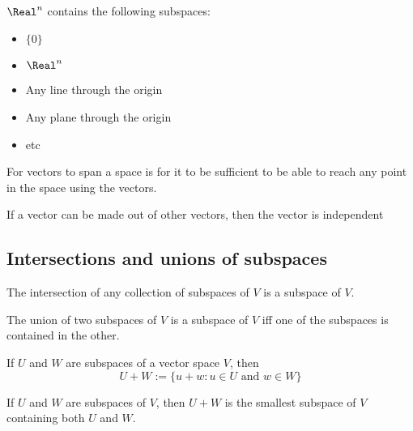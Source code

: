 \begin{theorem}
  $\Real^n$ contains the following subspaces:
  \begin{itemize}
    \item $\{ 0 \}$
    \item $\Real^n$
    \item Any line through the origin
    \item Any plane through the origin
    \item etc
  \end{itemize}
\end{theorem}

\begin{definition}[Spanning]
  For vectors to span a space is for it to be sufficient to be able to reach any point in the space using the vectors.
\end{definition}

\begin{definition}[Independence]
  If a vector can be made out of other vectors, then the vector is independent
\end{definition}

\subsection{Intersections and unions of subspaces}

\begin{theorem}
  The intersection of any collection of subspaces of $V$ is a subspace of $V$.
\end{theorem}

\begin{theorem}
  The union of two subspaces of $V$ is a subspace of $V$ iff one of the subspaces is contained in the other.
\end{theorem}

\begin{definition}
  If $U$ and $W$ are subspaces of a vector space $V$, then
  \[
    U + W := \{ u + w : u \in U \text{ and } w \in W \}
  \]
\end{definition}

\begin{theorem}
  If $U$ and $W$ are subspaces of $V$, then $U + W$ is the smallest subspace of $V$ containing both $U$ and $W$.
\end{theorem}

